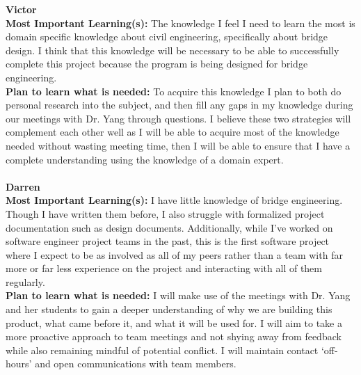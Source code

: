 \documentclass[12pt]{article}
\begin{document}
\noindent\textbf{Victor}\\
\textbf{Most Important Learning(s):} The knowledge I feel I need to learn the most is domain specific knowledge about civil engineering, specifically about bridge design. 
I think that this knowledge will be necessary to be able to successfully complete this project because the program is being designed for bridge engineering.\\
\textbf{Plan to learn what is needed:} To acquire this knowledge I plan to both do personal research into the subject, and then fill any gaps in my knowledge during 
our meetings with Dr. Yang through questions. I believe these two strategies will complement each other well as I will be able to acquire most of the knowledge needed 
without wasting meeting time, then I will be able to ensure that I have a complete understanding using the knowledge of a domain expert.\\\\

\noindent\textbf{Darren}\\
\textbf{Most Important Learning(s):} I have little knowledge of bridge engineering. Though I have written them before, I also struggle with formalized project documentation 
such as design documents. Additionally, while I've worked on software engineer project teams in the past, this is the first software project where I expect to be as involved as all of my 
peers rather than a team with far more or far less experience on the project and interacting with all of them regularly.\\
\textbf{Plan to learn what is needed:} I will make use of the meetings with Dr. Yang and her students to gain a deeper understanding of why we are building this product, 
what came before it, and what it will be used for. I will aim to take a more proactive approach to team meetings and not shying away from feedback while also remaining mindful of 
potential conflict. I will maintain contact `off-hours' and open communications with team members.\\\\
\end{document}
